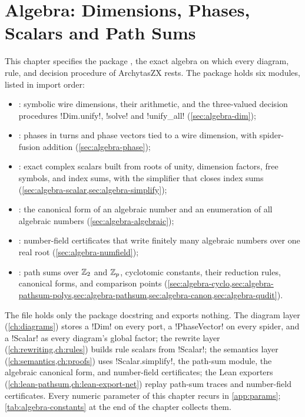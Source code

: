 \chapter{Algebra: Dimensions, Phases, Scalars and Path Sums}\label{ch:algebra}

This chapter specifies the package , the exact algebra on which every diagram, rule, and decision procedure of ArchytasZX rests. The package holds six modules, listed in import order:
\begin{itemize}
\item {}: symbolic wire dimensions, their arithmetic, and the three-valued decision procedures \py!Dim.unify!, \py!solve! and \py!unify_all! (\cref{sec:algebra-dim});
\item {}: phases in turns and phase vectors tied to a wire dimension, with spider-fusion addition (\cref{sec:algebra-phase});
\item {}: exact complex scalars built from roots of unity, dimension factors, free symbols, and index sums, with the simplifier that closes index sums (\cref{sec:algebra-scalar,sec:algebra-simplify});
\item {}: the canonical form of an algebraic number and an enumeration of all algebraic numbers (\cref{sec:algebra-algebraic});
\item {}: number-field certificates that write finitely many algebraic numbers over one real root (\cref{sec:algebra-numfield});
\item {}: path sums over $\mathbb{Z}_{2}$ and $\mathbb{Z}_{p}$, cyclotomic constants, their reduction rules, canonical forms, and comparison points (\cref{sec:algebra-cyclo,sec:algebra-pathsum-polys,sec:algebra-pathsum,sec:algebra-canon,sec:algebra-qudit}).
\end{itemize}
The file  holds only the package docstring and exports nothing. The diagram layer (\cref{ch:diagrams}) stores a \py!Dim! on every port, a \py!PhaseVector! on every spider, and a \py!Scalar! as every diagram's global factor; the rewrite layer (\cref{ch:rewriting,ch:rules}) builds rule scalars from \py!Scalar!; the semantics layer (\cref{ch:semantics,ch:proofs}) uses \py!Scalar.simplify!, the path-sum module, the algebraic canonical form, and number-field certificates; the Lean exporters (\cref{ch:lean-pathsum,ch:lean-export-net}) replay path-sum traces and number-field certificates. Every numeric parameter of this chapter recurs in \cref{app:params}; \cref{tab:algebra-constants} at the end of the chapter collects them.

